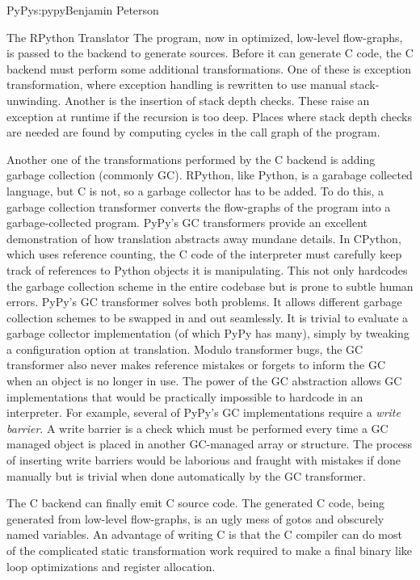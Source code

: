 \begin{aosachapter}{PyPy}{s:pypy}{Benjamin Peterson}
\begin{aosasect1}{The RPython Translator}
The program, now in optimized, low-level flow-graphs, is passed to the backend
to generate sources. Before it can generate C code, the C backend must perform
some additional transformations. One of these is exception transformation, where
exception handling is rewritten to use manual stack-unwinding. Another is the
insertion of stack depth checks. These raise an exception at runtime if the
recursion is too deep. Places where stack depth checks are needed are found by
computing cycles in the call graph of the program.

Another one of the transformations performed by the C backend is adding garbage
collection (commonly GC). RPython, like Python, is a garabage collected
language, but C is not, so a garbage collector has to be added. To do this, a
garbage collection transformer converts the flow-graphs of the program into a
garbage-collected program. PyPy's GC transformers provide an excellent
demonstration of how translation abstracts away mundane details. In CPython,
which uses reference counting, the C code of the interpreter must carefully keep
track of references to Python objects it is manipulating. This not only
hardcodes the garbage collection scheme in the entire codebase but is prone to
subtle human errors. PyPy's GC transformer solves both problems. It allows
different garbage collection schemes to be swapped in and out seamlessly. It is
trivial to evaluate a garbage collector implementation (of which PyPy has many),
simply by tweaking a configuration option at translation. Modulo transformer
bugs, the GC transformer also never makes reference mistakes or forgets to
inform the GC when an object is no longer in use. The power of the GC
abstraction allows GC implementations that would be practically impossible to
hardcode in an interpreter. For example, several of PyPy's GC implementations
require a \emph{write barrier}. A write barrier is a check which must be
performed every time a GC managed object is placed in another GC-managed array
or structure. The process of inserting write barriers would be laborious and
fraught with mistakes if done manually but is trivial when done automatically by
the GC transformer.

The C backend can finally emit C source code. The generated C code, being
generated from low-level flow-graphs, is an ugly mess of gotos and obscurely
named variables. An advantage of writing C is that the C compiler can do most of
the complicated static transformation work required to make a final binary like
loop optimizations and register allocation.


\end{aosasect1}
\end{aosachapter}
